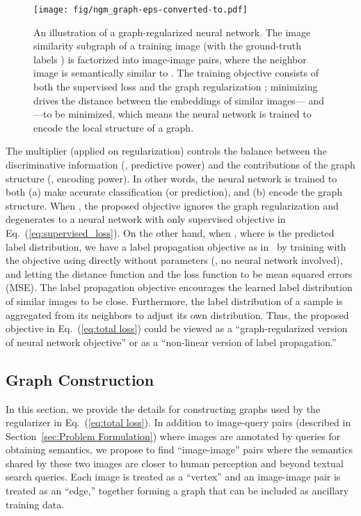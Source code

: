 \documentclass[sigconf]{acmart}
\begin{document}
\begin{figure*}[t]
\centering
      \texttt{[image: fig/ngm\_graph-eps-converted-to.pdf]}
      \vspace{-6pt}
  \caption{An illustration of a graph-regularized neural network. The image similarity subgraph of a training image  (with the ground-truth labels ) is factorized into image-image pairs, where the neighbor image  is semantically similar to . The training objective consists of both the supervised loss  and the graph regularization ; minimizing  drives the distance between the embeddings of similar images--- and ---to be minimized, which means the neural network is trained to encode the local structure of a graph.}
 \label{fig:ngm_image_eg}
\end{figure*}

The multiplier  (applied on regularization) controls the balance between the discriminative information (\ie, predictive power) and the contributions of the graph structure (\ie, encoding power). In other words, the neural network is trained to both (a) make accurate classification (or prediction), and (b) encode the graph structure. When , the proposed objective ignores the graph regularization and degenerates to a neural network with only supervised objective in Eq.~(\ref{eq:supervised_loss}). On the other hand, when , where  is the predicted label distribution, we have a label propagation objective as in~\cite{ravi2016large} by training with the objective using  directly without parameters  (\ie, no neural network involved), and letting the distance function  and the loss function  to be mean squared errors (MSE). The label propagation objective encourages the learned label distribution  of similar images to be close. Furthermore, the label distribution of a sample is aggregated from its neighbors to adjust its own distribution. Thus, the proposed objective in Eq.~(\ref{eq:total loss}) could be viewed as a ``graph-regularized version of neural network objective'' or as a ``non-linear version of label propagation.''

\subsection{Graph Construction}
\label{subsec:Graph Construction}
In this section, we provide the details for constructing graphs used by the regularizer  in Eq.~(\ref{eq:total loss}). In addition to image-query pairs (described in Section~\ref{sec:Problem Formulation}) where images are annotated by queries for obtaining semantics, we propose to find ``image-image'' pairs where the semantics shared by these two images are closer to human perception and beyond textual search queries. Each image is treated as a ``vertex'' and an image-image pair is treated as an ``edge,'' together forming a graph that can be included as ancillary training data. 
\end{document}
